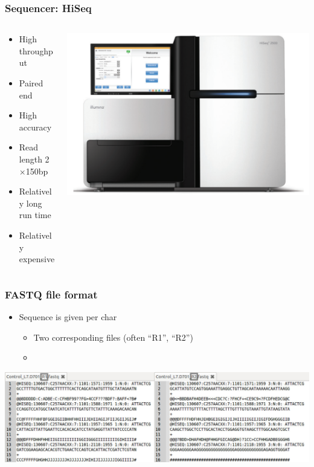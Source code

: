 \documentclass{beamer}			  %
\begin{document}
\begin{frame}
\frametitle{Sequencer: HiSeq}
  \begin{columns}[T]
	\begin{column}{.62\textwidth}
	\begin{itemize}
		\item High throughput
		\item Paired end
		\item High accuracy
		\item Read length 2$\times$150bp
		\item Relatively long run time
		\item Relatively expensive
	\end{itemize}
	\end{column}
	\begin{column}{.38\textwidth}
		\includegraphics[width=\textwidth]{figures/dge_02p.png}
	\end{column}
  \end{columns}
\end{frame}

\begin{frame}
	\frametitle{FASTQ file format}
	\begin{itemize}
		\item Sequence is given per char
		\begin{itemize}
			\item Two corresponding files (often ``R1”, ``R2”)
			\item[ ] \quad
		\end{itemize}
	\end{itemize}
	\begin{center}
		\includegraphics[width=\textwidth]{figures/dge_03ap.png}
	\end{center}
\end{frame}
\end{document}
